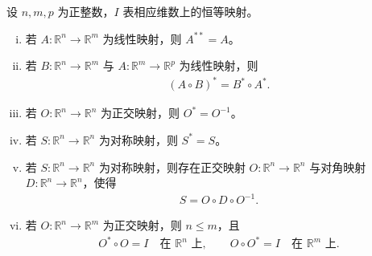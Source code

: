 \documentclass[../../main.tex]{subfiles}%
\begin{document}
\begin{theorem}[线性代数]\label{theorem:ch03-3-4}
设 $n,m,p$ 为正整数，$I$ 表相应维数上的恒等映射。
\begin{enumerate}[(i)]
\item 若 $A:\mathbb{R}^n\to\mathbb{R}^m$ 为线性映射，则 $A^{**}=A$。
\item 若 $B:\mathbb{R}^n\to\mathbb{R}^m$ 与 $A:\mathbb{R}^m\to\mathbb{R}^p$ 为线性映射，则
\begin{align*}
(A\circ B)^*=B^*\circ A^*.
\end{align*}
\item 若 $O:\mathbb{R}^n\to\mathbb{R}^n$ 为正交映射，则 $O^*=O^{-1}$。
\item 若 $S:\mathbb{R}^n\to\mathbb{R}^n$ 为对称映射，则 $S^*=S$。
\item 若 $S:\mathbb{R}^n\to\mathbb{R}^n$ 为对称映射，则存在正交映射 $O:\mathbb{R}^n\to\mathbb{R}^n$ 与对角映射 $D:\mathbb{R}^n\to\mathbb{R}^n$，使得
\begin{align*}
S=O\circ D\circ O^{-1}.
\end{align*}
\item 若 $O:\mathbb{R}^n\to\mathbb{R}^m$ 为正交映射，则 $n\leqslant m$，且
\begin{align*}
O^*\circ O=I\quad\text{在 }\mathbb{R}^n\text{ 上},\qquad
O\circ O^*=I\quad\text{在 }\mathbb{R}^m\text{ 上}.
\end{align*}
\end{enumerate}
\end{theorem}
\end{document}
